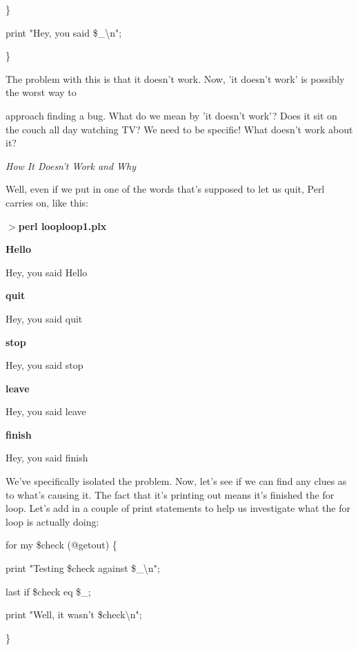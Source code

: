 \documentclass[a4paper,11pt]{book}
\begin{document}
\noindent \}

\noindent print "Hey, you said \$\_\textbackslash n";

\noindent \}

\noindent 

\noindent The problem with this is that it doesn't work. Now, 'it doesn't work' is possibly the worst way to

\noindent approach finding a bug. What do we mean by 'it doesn't work'? Does it sit on the couch all day watching TV? We need to be specific! What doesn't work about it?

\noindent 

\noindent \textit{How It Doesn't Work and Why}

\noindent Well, even if we put in one of the words that's supposed to let us quit, Perl carries on, like this:

\noindent 

\noindent $>$\textbf{perl looploop1.plx}

\noindent \textbf{Hello}

\noindent Hey, you said Hello

\noindent \textbf{quit}

\noindent Hey, you said quit

\noindent \textbf{stop}

\noindent Hey, you said stop

\noindent \textbf{leave}

\noindent Hey, you said leave

\noindent \textbf{finish}

\noindent Hey, you said finish

\noindent 

\noindent We've specifically isolated the problem. Now, let's see if we can find any clues as to what's causing it. The fact that it's printing out means it's finished the for loop. Let's add in a couple of print statements to help us investigate what the for loop is actually doing:

\noindent 

\noindent for my \$check (@getout) \{

\noindent print "Testing \$check against \$\_\textbackslash n";

\noindent last if \$check eq \$\_;

\noindent print "Well, it wasn't \$check\textbackslash n";

\noindent \}

\noindent 
\end{document}
